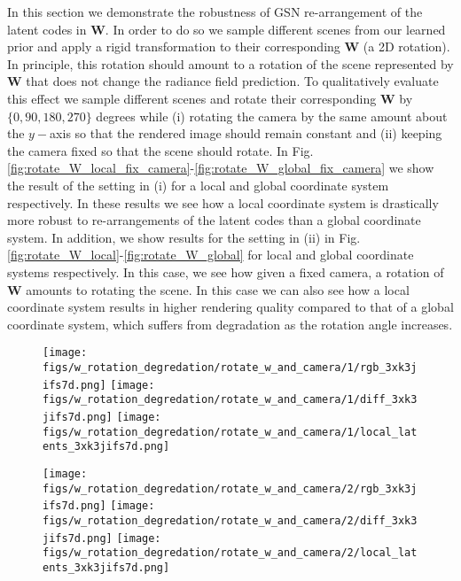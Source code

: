 \documentclass[10pt,twocolumn,letterpaper]{article}
\begin{document}
In this section we demonstrate the robustness of GSN \wrt re-arrangement of the latent codes in $\textbf{W}$. In order to do so we sample different scenes from our learned prior and apply a rigid transformation to their corresponding $\textbf{W}$ (a 2D rotation). In principle, this rotation should amount to a rotation of the scene represented by $\textbf{W}$ that does not change the radiance field prediction. To qualitatively evaluate this effect we sample different scenes and rotate their corresponding $\textbf{W}$ by $\{0, 90, 180, 270\}$ degrees while (i) rotating the camera by the same amount about the $y-$axis so that the rendered image should remain constant and (ii) keeping the camera fixed so that the scene should rotate. In Fig. \ref{fig:rotate_W_local_fix_camera}-\ref{fig:rotate_W_global_fix_camera} we show the result of the setting in (i) for a local and global coordinate system respectively. In these results we see how a local coordinate system is drastically more robust to re-arrangements of the latent codes than a global coordinate system. In addition, we show results for the setting in (ii) in Fig. \ref{fig:rotate_W_local}-\ref{fig:rotate_W_global} for local and global coordinate systems respectively. In this case, we see how given a fixed camera, a rotation of $\textbf{W}$ amounts to rotating the scene. In this case we can also see how a local coordinate system results in higher rendering quality compared to that of a global coordinate system, which suffers from degradation as the rotation angle increases.


\begin{figure*}[h]
	\centering
	\begin{subfigure}{0.49\linewidth}
		\centering
		\texttt{[image: figs/w\_rotation\_degredation/rotate\_w\_and\_camera/1/rgb\_3xk3jifs7d.png]}
		\texttt{[image: figs/w\_rotation\_degredation/rotate\_w\_and\_camera/1/diff\_3xk3jifs7d.png]}
		\texttt{[image: figs/w\_rotation\_degredation/rotate\_w\_and\_camera/1/local\_latents\_3xk3jifs7d.png]}
	\end{subfigure} \hfill
	\begin{subfigure}{0.49\linewidth}
		\centering
		\texttt{[image: figs/w\_rotation\_degredation/rotate\_w\_and\_camera/2/rgb\_3xk3jifs7d.png]}
		\texttt{[image: figs/w\_rotation\_degredation/rotate\_w\_and\_camera/2/diff\_3xk3jifs7d.png]}
		\texttt{[image: figs/w\_rotation\_degredation/rotate\_w\_and\_camera/2/local\_latents\_3xk3jifs7d.png]}
	\end{subfigure}
	\caption{Change in generation output as local latent codes are rotated with a \textit{local} coordinate system for two different scenes. (Top) Rendered image. (Middle) Residual  degree rotation. (Bottom) Visualization of $\textbf{W}$. Each column corresponds to a rotation of the camera and $\textbf{W}$ in $\{0, 90, 180, 270\}$.}
	\label{fig:rotate_W_local_fix_camera}
\end{figure*}
\end{document}
